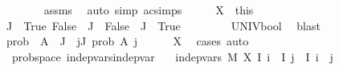 \begin{isabellebody}
\ \ \ \ \ \ \isamarkupfalse%
\ assms\ \isamarkupfalse%
\ {\isacharparenleft}{\kern0pt}auto\ simp{\isacharcolon}{\kern0pt}\ ac{\isacharunderscore}{\kern0pt}simps{\isacharparenright}{\kern0pt}\isanewline
\ \ \isacommand{{\isacharbraceright}{\kern0pt}}\isamarkupfalse%
\ \isamarkupfalse%
\ X\ {\isacharequal}{\kern0pt}\ this\isanewline
\ \ \isamarkupfalse%
\ {\isachardoublequoteopen}J\ {\isacharequal}{\kern0pt}\ {\isacharbraceleft}{\kern0pt}True{\isacharcomma}{\kern0pt}\ False{\isacharbraceright}{\kern0pt}{\isachardoublequoteclose}\ {\isacharbar}{\kern0pt}\ {\isachardoublequoteopen}J\ {\isacharequal}{\kern0pt}\ {\isacharbraceleft}{\kern0pt}False{\isacharbraceright}{\kern0pt}{\isachardoublequoteclose}\ {\isacharbar}{\kern0pt}\ {\isachardoublequoteopen}J\ {\isacharequal}{\kern0pt}\ {\isacharbraceleft}{\kern0pt}True{\isacharbraceright}{\kern0pt}{\isachardoublequoteclose}\isanewline
\ \ \ \ \isamarkupfalse%
\ {\isacharasterisk}{\kern0pt}{\isacharparenleft}{\kern0pt}{}{\isacharcomma}{\kern0pt}{}{\isacharparenright}{\kern0pt}\ \isamarkupfalse%
\ UNIV{\isacharunderscore}{\kern0pt}bool\ \isamarkupfalse%
\ blast\isanewline
\ \ \isamarkupfalse%
\ \isamarkupfalse%
\ {\isachardoublequoteopen}prob\ {\isacharparenleft}{\kern0pt}{\isasymInter}\ {\isacharparenleft}{\kern0pt}A\ {\isacharbackquote}{\kern0pt}\ J{\isacharparenright}{\kern0pt}{\isacharparenright}{\kern0pt}\ {\isacharequal}{\kern0pt}\ {\isacharparenleft}{\kern0pt}{\isasymProd}j{\isasymin}J{\isachardot}{\kern0pt}\ prob\ {\isacharparenleft}{\kern0pt}A\ j{\isacharparenright}{\kern0pt}{\isacharparenright}{\kern0pt}{\isachardoublequoteclose}\isanewline
\ \ \ \ \isamarkupfalse%
\ X\ \isamarkupfalse%
\ {\isacharparenleft}{\kern0pt}cases{\isacharsemicolon}{\kern0pt}\ auto{\isacharparenright}{\kern0pt}\isanewline
{}\isamarkupfalse%
%
\endisatagproof
{\isafoldproof}%
%
\isadelimproof
\isanewline
%
\endisadelimproof
\isanewline
{}\isamarkupfalse%
\ {\isacharparenleft}{\kern0pt}\ prob{\isacharunderscore}{\kern0pt}space{\isacharparenright}{\kern0pt}\ indep{\isacharunderscore}{\kern0pt}vars{\isacharunderscore}{\kern0pt}indep{\isacharunderscore}{\kern0pt}var{\isacharcolon}{\kern0pt}\isanewline
\ \ \ {\isachardoublequoteopen}indep{\isacharunderscore}{\kern0pt}vars\ M{\isacharprime}{\kern0pt}\ X\ I{\isachardoublequoteclose}\ {\isachardoublequoteopen}i\ {\isasymin}\ I{\isachardoublequoteclose}\ {\isachardoublequoteopen}j\ {\isasymin}\ I{\isachardoublequoteclose}\ {\isachardoublequoteopen}i\ {\isasymnoteq}\ j{\isachardoublequoteclose}\isanewline

\end{isabellebody}

